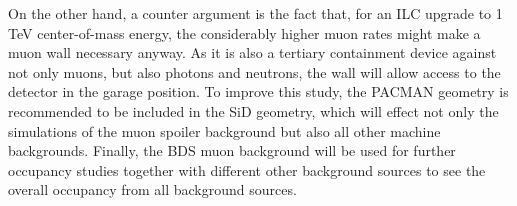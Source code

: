 On the other hand, a counter argument is the fact that, for an ILC upgrade to \unit{1}\,{TeV} center-of-mass energy, the considerably higher muon rates might make a muon wall necessary anyway.
As it is also a tertiary containment device against not only muons, but also photons and neutrons, the wall will allow access to the detector in the garage position.
To improve this study, the PACMAN geometry is recommended to be included in the SiD geometry, which will effect not only the simulations of the muon spoiler background but also all other machine backgrounds.
Finally, the BDS muon background will be used for further occupancy studies together with different other background sources to see the overall occupancy from all background sources.